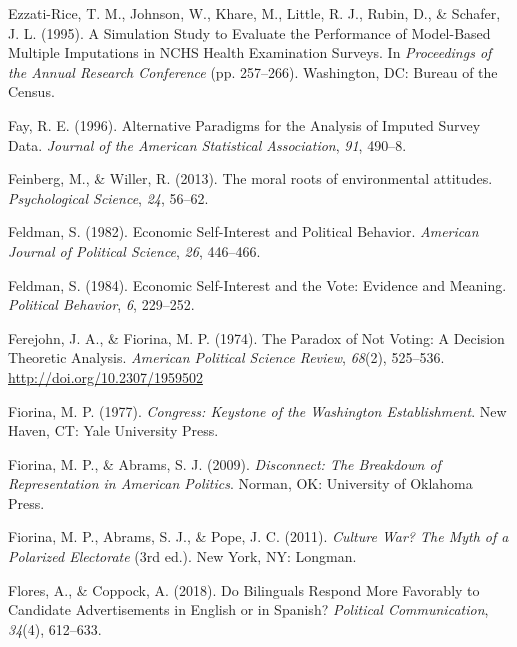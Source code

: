 \documentclass[12pt,econ]{sources/authesis}
\begin{document}
\leavevmode\hypertarget{ref-ezzati-rice_1995_simulation}{}%
Ezzati-Rice, T. M., Johnson, W., Khare, M., Little, R. J., Rubin, D., \& Schafer, J. L. (1995). A Simulation Study to Evaluate the Performance of Model-Based Multiple Imputations in NCHS Health Examination Surveys. In \emph{Proceedings of the Annual Research Conference} (pp. 257--266). Washington, DC: Bureau of the Census.

\leavevmode\hypertarget{ref-fay_1996_alternative}{}%
Fay, R. E. (1996). Alternative Paradigms for the Analysis of Imputed Survey Data. \emph{Journal of the American Statistical Association}, \emph{91}, 490--8.

\leavevmode\hypertarget{ref-feinberg_2013_moral}{}%
Feinberg, M., \& Willer, R. (2013). The moral roots of environmental attitudes. \emph{Psychological Science}, \emph{24}, 56--62.

\leavevmode\hypertarget{ref-feldman_economic_1982}{}%
Feldman, S. (1982). Economic Self-Interest and Political Behavior. \emph{American Journal of Political Science}, \emph{26}, 446--466.

\leavevmode\hypertarget{ref-feldman_economic_1984}{}%
Feldman, S. (1984). Economic Self-Interest and the Vote: Evidence and Meaning. \emph{Political Behavior}, \emph{6}, 229--252.

\leavevmode\hypertarget{ref-ferejohn_paradox_1974}{}%
Ferejohn, J. A., \& Fiorina, M. P. (1974). The Paradox of Not Voting: A Decision Theoretic Analysis. \emph{American Political Science Review}, \emph{68}(2), 525--536. \url{http://doi.org/10.2307/1959502}

\leavevmode\hypertarget{ref-fiorina_congress:_1977}{}%
Fiorina, M. P. (1977). \emph{Congress: Keystone of the Washington Establishment}. New Haven, CT: Yale University Press.

\leavevmode\hypertarget{ref-fiorina_disconnect_2009}{}%
Fiorina, M. P., \& Abrams, S. J. (2009). \emph{Disconnect: The Breakdown of Representation in American Politics}. Norman, OK: University of Oklahoma Press.

\leavevmode\hypertarget{ref-fiorina_culture_2011}{}%
Fiorina, M. P., Abrams, S. J., \& Pope, J. C. (2011). \emph{Culture War? The Myth of a Polarized Electorate} (3rd ed.). New York, NY: Longman.

\leavevmode\hypertarget{ref-flores_2018_bilinguals}{}%
Flores, A., \& Coppock, A. (2018). Do Bilinguals Respond More Favorably to Candidate Advertisements in English or in Spanish? \emph{Political Communication}, \emph{34}(4), 612--633.
\end{document}
